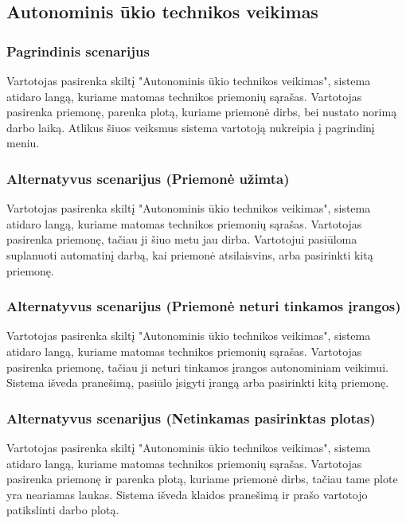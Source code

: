 \documentclass[oneside]{VUMIFPSkursinis}
\begin{document}
\subsection{Autonominis ūkio technikos veikimas}
\subsubsection{Pagrindinis scenarijus}
	Vartotojas pasirenka skiltį "Autonominis ūkio technikos veikimas", sistema atidaro langą, kuriame matomas technikos priemonių sąrašas. Vartotojas pasirenka priemonę, parenka plotą, kuriame priemonė dirbs, bei nustato norimą darbo laiką. Atlikus šiuos veiksmus sistema vartotoją nukreipia į pagrindinį meniu.
\subsubsection{Alternatyvus scenarijus (Priemonė užimta)}
	Vartotojas pasirenka skiltį "Autonominis ūkio technikos veikimas", sistema atidaro langą, kuriame matomas technikos priemonių sąrašas. Vartotojas pasirenka priemonę, tačiau ji šiuo metu jau dirba. Vartotojui pasiūloma suplanuoti automatinį darbą, kai priemonė atsilaisvins, arba pasirinkti kitą priemonę.
\subsubsection{Alternatyvus scenarijus (Priemonė neturi tinkamos įrangos)}
	Vartotojas pasirenka skiltį "Autonominis ūkio technikos veikimas", sistema atidaro langą, kuriame matomas technikos priemonių sąrašas. Vartotojas pasirenka priemonę, tačiau ji neturi tinkamos įrangos autonominiam veikimui. Sistema išveda pranešimą, pasiūlo įsigyti įrangą arba pasirinkti kitą priemonę.
\subsubsection{Alternatyvus scenarijus (Netinkamas pasirinktas plotas)}
	Vartotojas pasirenka skiltį "Autonominis ūkio technikos veikimas", sistema atidaro langą, kuriame matomas technikos priemonių sąrašas. Vartotojas pasirenka priemonę ir parenka plotą, kuriame priemonė dirbs, tačiau tame plote yra neariamas laukas. Sistema išveda klaidos pranešimą ir prašo vartotojo patikslinti darbo plotą.
\end{document}
